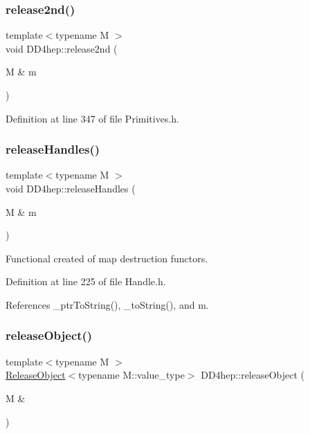 \subsubsection{\texorpdfstring{release2nd()}{release2nd()}}
{\footnotesize\ttfamily template$<$typename M $>$ \\
void D\+D4hep\+::release2nd (\begin{DoxyParamCaption}\item[{M \&}]{m }\end{DoxyParamCaption})}



Definition at line 347 of file Primitives.\+h.

\hypertarget{namespace_d_d4hep_a56159042afdaf37c72cca9d309907e6b}{}\label{namespace_d_d4hep_a56159042afdaf37c72cca9d309907e6b} 
\subsubsection{\texorpdfstring{release\+Handles()}{releaseHandles()}}
{\footnotesize\ttfamily template$<$typename M $>$ \\
void D\+D4hep\+::release\+Handles (\begin{DoxyParamCaption}\item[{M \&}]{m }\end{DoxyParamCaption})}



Functional created of map destruction functors. 



Definition at line 225 of file Handle.\+h.



References \+\_\+ptr\+To\+String(), \+\_\+to\+String(), and m.

\hypertarget{namespace_d_d4hep_a22ef55856c463708ea72a02dcca99fc1}{}\label{namespace_d_d4hep_a22ef55856c463708ea72a02dcca99fc1} 
\subsubsection{\texorpdfstring{release\+Object()}{releaseObject()}}
{\footnotesize\ttfamily template$<$typename M $>$ \\
\hyperlink{class_d_d4hep_1_1_release_object}{Release\+Object}$<$typename M\+::value\+\_\+type$>$ D\+D4hep\+::release\+Object (\begin{DoxyParamCaption}\item[{M \&}]{ }\end{DoxyParamCaption})}



